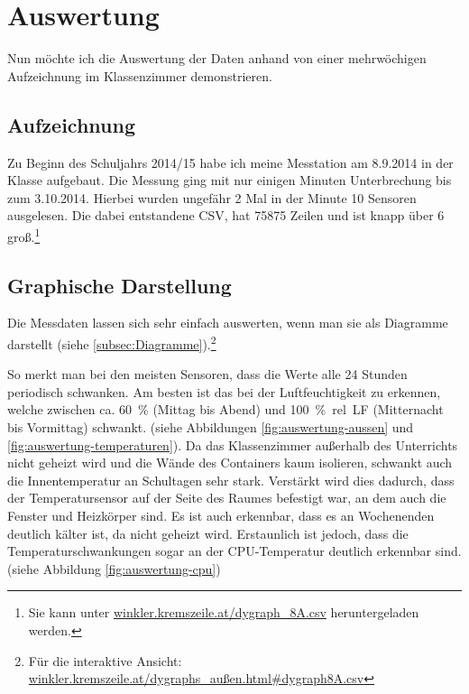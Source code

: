 \chapter{Auswertung}
\label{cha:Auswertung}

Nun möchte ich die Auswertung der Daten anhand von einer mehrwöchigen Aufzeichnung im Klassenzimmer demonstrieren.

\section{Aufzeichnung}
\label{auswertung_aufzeichnung}

Zu Beginn des Schuljahrs 2014/15 habe ich meine Messtation am 8.9.2014 in der Klasse aufgebaut. Die Messung ging mit nur einigen Minuten Unterbrechung bis zum 3.10.2014. Hierbei wurden ungefähr 2 Mal in der Minute 10 Sensoren ausgelesen. Die dabei entstandene \gls{CSV}, hat 75875 Zeilen und ist knapp über \SI{6}{\mega\byte} groß.\footnote{Sie kann unter \href{http://winkler.kremszeile.at/dygraph_8A.csv}{winkler.kremszeile.at/dygraph\_8A.csv} heruntergeladen werden.}

\section{Graphische Darstellung}

Die Messdaten lassen sich sehr einfach auswerten, wenn man sie als Diagramme darstellt (siehe \ref{subsec:Diagramme}).\footnote{Für die interaktive Ansicht: \href{http://winkler.kremszeile.at/dygraphs_au\%C3\%9Fen.html\#dygraph8A.csv}{winkler.kremszeile.at/dygraphs\_außen.html\#dygraph8A.csv}}

So merkt man bei den meisten Sensoren, dass die Werte alle 24 Stunden periodisch schwanken. Am besten ist das bei der Luftfeuchtigkeit zu erkennen, welche zwischen ca. \SI{60}{\%} (Mittag bis Abend) und \SI{100}{\%.rel.LF} (Mitternacht bis Vormittag) schwankt. (siehe Abbildungen \ref{fig:auswertung-aussen} und \ref{fig:auswertung-temperaturen}).
Da das Klassenzimmer außerhalb des Unterrichts nicht geheizt wird und die Wände des Containers kaum isolieren, schwankt auch die Innentemperatur an Schultagen sehr stark. Verstärkt wird dies dadurch, dass der Temperatursensor auf der Seite des Raumes befestigt war, an dem auch die Fenster und Heizkörper sind. Es ist auch erkennbar, dass es an Wochenenden deutlich kälter  ist, da nicht geheizt wird. 
Erstaunlich ist jedoch, dass die Temperaturschwankungen sogar an der \gls{CPU}-Temperatur deutlich erkennbar sind. (siehe Abbildung \ref{fig:auswertung-cpu})


